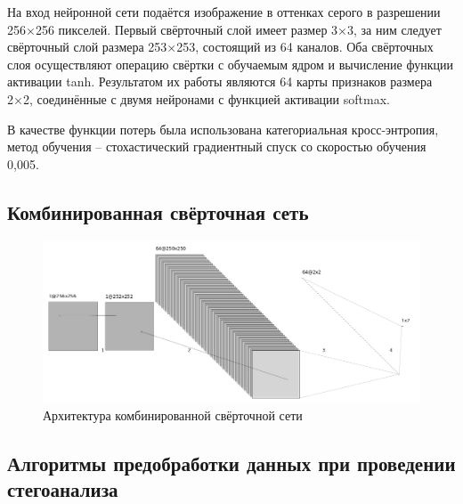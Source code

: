 На вход нейронной сети подаётся изображение в оттенках серого в разрешении 256×256 пикселей. Первый свёрточный слой имеет размер 3×3, за ним следует свёрточный слой размера 253×253, состоящий из 64 каналов. Оба свёрточных слоя осуществляют операцию свёртки с обучаемым ядром и вычисление функции активации tanh. Результатом их работы являются 64 карты признаков размера 2×2, соединённые с двумя нейронами с функцией активации softmax.

В качестве функции потерь была использована категориальная кросс-энтропия, метод обучения – стохастический градиентный спуск со скоростью обучения 0,005.

\subsection{Комбинированная свёрточная сеть}

\begin{figure}[!htb]
\centering
\includegraphics[width=1\textwidth]{include/graphics/mixed_gray_architecture}
\caption{Архитектура комбинированной свёрточной сети}
\label{fig:FrenchCNNArchitecture}
\end{figure}
\subsection{Алгоритмы предобработки данных при проведении стегоанализа}

\clearpage
